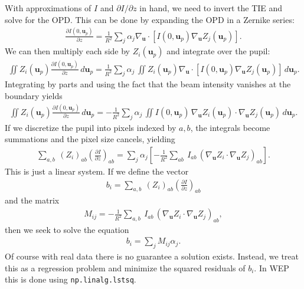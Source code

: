 \documentclass[TS,authoryear,toc]{lsstdoc}
\begin{document}
With approximations of $I$ and $\partial I / \partial z$ in hand, we need to invert the TIE and solve for the OPD.
This can be done by expanding the OPD in a Zernike series:
\begin{align}
    \frac{\partial I(0, \mathbf{u}_p)}{\partial z} =
    \frac{1}{R^2} \sum_j \alpha_j
        \nabla_\mathbf{u} \cdot [I(0, \mathbf{u}_p) \nabla_\mathbf{u} Z_j(\mathbf{u}_p)].
\end{align}
We can then multiply each side by $Z_i(\mathbf{u}_p)$ and integrate over the pupil:
\begin{align}
    \iint Z_i(\mathbf{u}_p) \frac{\partial I(0, \mathbf{u}_p)}{\partial z} \, d\mathbf{u}_p =
    \frac{1}{R^2} \sum_j \alpha_j \, \iint Z_i(\mathbf{u}_p) \nabla_\mathbf{u} \cdot [I(0, \mathbf{u}_p) \nabla_\mathbf{u} Z_j(\mathbf{u}_p)] \, d\mathbf{u}_p.
\end{align}
Integrating by parts and using the fact that the beam intensity vanishes at the boundary yields
\begin{align}
    \iint Z_i(\mathbf{u}_p) \frac{\partial I(0, \mathbf{u}_p)}{\partial z} \, d\mathbf{u}_p =
    -\frac{1}{R^2} \sum_j \alpha_j \, \iint I(0, \mathbf{u}_p) \, \nabla_\mathbf{u} Z_i(\mathbf{u}_p) \cdot \nabla_\mathbf{u} Z_j(\mathbf{u}_p) \, d\mathbf{u}_p.
\end{align}
If we discretize the pupil into pixels indexed by $a, b$, the integrals become summations and the pixel size cancels, yielding
\begin{align}
    \sum_{a, b} ~ (Z_i)_{ab} \left(\frac{\partial I}{\partial z}\right)_{ab} =
    \sum_j \alpha_j \left[
        -\frac{1}{R^2} \sum_{ab} ~ I_{ab} \, (\nabla_\mathbf{u} Z_i \cdot \nabla_\mathbf{u} Z_j)_{ab}
    \right].
\end{align}
This is just a linear system.
If we define the vector
\begin{align}
    b_i = \sum_{a, b} ~ (Z_i)_{ab} \left(\frac{\partial I}{\partial z}\right)_{ab}
\end{align}
and the matrix
\begin{align}
    M_{ij} = -\frac{1}{R^2} \sum_{a,b} ~ I_{ab} \, (\nabla_\mathbf{u} Z_i \cdot \nabla_\mathbf{u} Z_j)_{ab},
\end{align}
then we seek to solve the equation
\begin{align}
    b_i = \sum_j M_{ij} \alpha_j.
\end{align}
Of course with real data there is no guarantee a solution exists.
Instead, we treat this as a regression problem and minimize the squared residuals of $b_i$.
In WEP this is done using \texttt{np.linalg.lstsq}.
\end{document}
